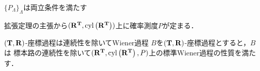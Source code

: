 	\begin{itembox}[l]{$\{P_\Lambda\}_\Lambda$は両立条件を満たす}
	\end{itembox}
	
	\begin{sketch}
		
	\end{sketch}
	
	拡張定理の主張から$(\mathbf{R}^{\mathbf{T}},\operatorname{cyl}\left(\mathbf{R}^{\mathbf{T}}\right))$上に確率測度$P$が定まる．
	
	\begin{itembox}[l]{$(\mathbf{T},\mathbf{R})$-座標過程は連続性を除いてWiener過程}
		$B$を$(\mathbf{T},\mathbf{R})$-座標過程とすると，$B$は
		標本路の連続性を除いて$(\mathbf{R}^{\mathbf{T}},\operatorname{cyl}\left(\mathbf{R}^{\mathbf{T}}\right),P)$上の標準Wiener過程の性質を満たす．
	\end{itembox}